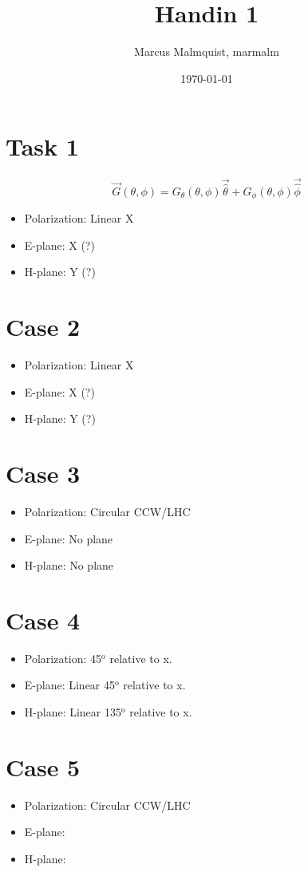 \documentclass[12pt,a4paper]{article}
\title{Handin 1}
\author{Marcus Malmquist, marmalm}
\date{\today}
\begin{document}
\maketitle

\section{Task 1}\label{sec:1}
\begin{equation}
  \label{eq:far_fiel_gen}
  \vec{G}(\theta,\phi) = G_{\theta}(\theta,\phi)\vec{\hat{\theta}} + G_{\phi}(\theta,\phi)\vec{\hat{\phi}}
  
\end{equation}
\begin{itemize}
\item Polarization: Linear X
\item E-plane: X (?)
\item H-plane: Y (?)
\end{itemize}
\section{Case 2}\label{sec:2}
\begin{itemize}
\item Polarization: Linear X
\item E-plane: X (?)
\item H-plane: Y (?)
\end{itemize}
\section{Case 3}\label{sec:3}
\begin{itemize}
\item Polarization: Circular CCW/LHC
\item E-plane: No plane
\item H-plane: No plane
\end{itemize}
\section{Case 4}\label{sec:4}
\begin{itemize}
\item Polarization: 45$^\text{o}$ relative to x.
\item E-plane: Linear 45$^\text{o}$ relative to x.
\item H-plane: Linear 135$^\text{o}$ relative to x.
\end{itemize}
\section{Case 5}\label{sec:5}
\begin{itemize}
\item Polarization: Circular CCW/LHC
\item E-plane: 
\item H-plane: 
\end{itemize}
\end{document}
